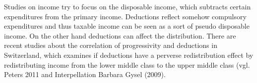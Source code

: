 Studies on income try to focus on the disposable income, which subtracts certain expenditures from the primary income. Deductions reflect somehow compulsory expenditures and thus taxable income can be seen as a sort of pseudo disposable income. On the other hand deductions can affect the distribution. There are recent studies about the correlation of progressivity and deductions in Switzerland, which examines if deductions have a perverse redistribution effect by redistributing income from the lower middle class to the upper middle class (vgl. Peters 2011 and Interpellation Barbara Gysel (2009).







